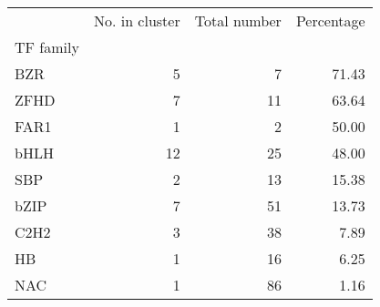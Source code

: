 \begin{tabular}{lrrr}
\toprule
{} &  No. in cluster &  Total number &  Percentage \\
TF family &                 &               &             \\
\midrule
BZR       &               5 &             7 &       71.43 \\
ZFHD      &               7 &            11 &       63.64 \\
FAR1      &               1 &             2 &       50.00 \\
bHLH      &              12 &            25 &       48.00 \\
SBP       &               2 &            13 &       15.38 \\
bZIP      &               7 &            51 &       13.73 \\
C2H2      &               3 &            38 &        7.89 \\
HB        &               1 &            16 &        6.25 \\
NAC       &               1 &            86 &        1.16 \\
\bottomrule
\end{tabular}
